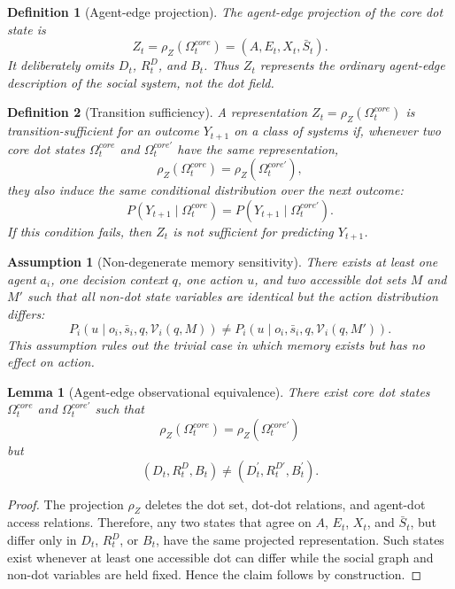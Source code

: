 \documentclass[11pt]{article}
\newtheorem{definition}{Definition}
\newtheorem{assumption}{Assumption}
\newtheorem{lemma}{Lemma}
\theoremstyle{remark}
\begin{document}
\begin{definition}[Agent-edge projection]
The agent-edge projection of the core dot state is
$$
Z_t=\rho_Z(\Omega_t^{core})=(A,E_t,X_t,\bar S_t).
$$
It deliberately omits $D_t$, $R_t^D$, and $B_t$. Thus $Z_t$ represents the ordinary agent-edge description of the social system, not the dot field.
\end{definition}

\begin{definition}[Transition sufficiency]
A representation $Z_t=\rho_Z(\Omega_t^{core})$ is transition-sufficient for an outcome $Y_{t+1}$ on a class of systems if, whenever two core dot states $\Omega_t^{core}$ and $\Omega_t^{core\prime}$ have the same representation,
$$
\rho_Z(\Omega_t^{core})=\rho_Z(\Omega_t^{core\prime}),
$$
they also induce the same conditional distribution over the next outcome:
$$
P(Y_{t+1}\mid \Omega_t^{core})=P(Y_{t+1}\mid \Omega_t^{core\prime}).
$$
If this condition fails, then $Z_t$ is not sufficient for predicting $Y_{t+1}$.
\end{definition}

\begin{assumption}[Non-degenerate memory sensitivity]
There exists at least one agent $a_i$, one decision context $q$, one action $u$, and two accessible dot sets $M$ and $M'$ such that all non-dot state variables are identical but the action distribution differs:
$$
P_i(u\mid o_i,\bar s_i,q,\mathcal V_i(q,M))
\neq
P_i(u\mid o_i,\bar s_i,q,\mathcal V_i(q,M')).
$$
This assumption rules out the trivial case in which memory exists but has no effect on action.
\end{assumption}

\begin{lemma}[Agent-edge observational equivalence]
There exist core dot states $\Omega_t^{core}$ and $\Omega_t^{core\prime}$ such that
$$
\rho_Z(\Omega_t^{core})=\rho_Z(\Omega_t^{core\prime})
$$
but
$$
(D_t,R_t^D,B_t)\neq (D_t^{\prime},R_t^{D\prime},B_t^{\prime}).
$$
\end{lemma}

\begin{proof}
The projection $\rho_Z$ deletes the dot set, dot-dot relations, and agent-dot access relations. Therefore, any two states that agree on $A$, $E_t$, $X_t$, and $\bar S_t$, but differ only in $D_t$, $R_t^D$, or $B_t$, have the same projected representation. Such states exist whenever at least one accessible dot can differ while the social graph and non-dot variables are held fixed. Hence the claim follows by construction.
\end{proof}
\end{document}
